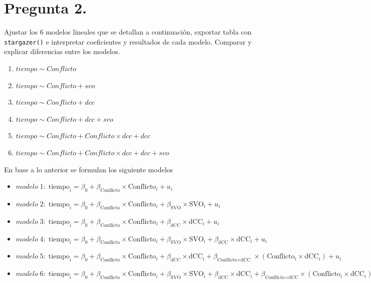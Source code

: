 \documentclass[
  spanish,
  10pt,
]{article}
\begin{document}
\newpage

\section{Pregunta 2.}\label{pregunta-2.}

Ajustar los 6 modelos lineales que se detallan a continuación, exportar
tabla con \texttt{stargazer()} e interpretar coeficientes y resultados
de cada modelo. Comparar y explicar diferencias entre los modelos.

\begin{enumerate}
\def\labelenumi{(\alph{enumi})}
\item
  \(tiempo \sim Conflicto\)
\item
  \(tiempo \sim Conflicto + svo\)
\item
  \(tiempo \sim Conflicto + dcc\)
\item
  \(tiempo \sim Conflicto + dcc + svo\)
\item
  \(tiempo \sim Conflicto + Conflicto \times dcc + dcc\)
\item
  \(tiempo \sim Conflicto + Conflicto \times dcc + dcc + svo\)
\end{enumerate}

En base a lo anterior se formulan los siguiente modelos

\begin{itemize}
\item
  \(modelo\;1:\; \text{tiempo}_i= \beta_0 + \beta_{\text{Conflicto}}\times\text{Conflicto}_i+ u_i\)
\item
  \(modelo\;2:\; \text{tiempo}_i= \beta_0 + \beta_{\text{Conflicto}}\times\text{Conflicto}_i + \beta_{\text{SVO}}\times\text{SVO}_i+ u_i\)
\item
  \(modelo \; 3:\; \text{tiempo}_i= \beta_0 + \beta_{\text{Conflicto}}\times\text{Conflicto}_i + \beta_{\text{dCC}}\times\text{dCC}_i+ u_i\)
\item
  \(modelo\;4:\; \text{tiempo}_i = \beta_0 + \beta_{\text{Conflicto}}\times\text{Conflicto}_i+ \beta_{\text{SVO}}\times\text{SVO}_i+ \beta_{\text{dCC}}\times\text{dCC}_i+ u_i\)
\item
  \(modelo\;5:\; \text{tiempo}_i= \beta_0 + \beta_{\text{Conflicto}}\times\text{Conflicto}_i + \beta_{\text{dCC}}\times\text{dCC}_i + \beta_{\text{Conflicto}\times\text{dCC}}\;      \times(\text{Conflicto}_i\times\text{dCC}_i) + u_i\)
\item
  \(modelo\;6:\; \text{tiempo}_i = \beta_0 + \beta_{\text{Conflicto}}\times\text{Conflicto}_i + \beta_{\text{SVO}}\times\text{SVO}_i + \beta_{\text{dCC}}\times\text{dCC}_i + \beta_{\text{Conflicto}\times\text{dCC}}\times(\text{Conflicto}_i\times\text{dCC}_i) + u_i\)
\end{itemize}
\end{document}
